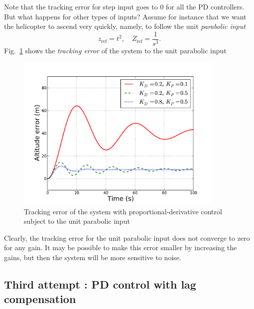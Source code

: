 \documentclass[a4paper,11pt]{report}
\theoremstyle{definition}
\newcommand{\re}{\mathrm{ref}}
\begin{document}
Note that the tracking error for step input goes to 0 for all the PD
controllers. But what happens for other types of inputs? Assume for
instance that we want the helicopter to ascend very quickly, namely,
to follow the unit \emph{parabolic input}
\[
z_\re = t^2, \quad Z_\re = \frac{1}{s^3}.
\]
Fig.~\ref{fig:paraberr} shows the \emph{tracking error}  of the system to the
unit parabolic input
\begin{figure}[H]
  \centering
  \includegraphics[width=10cm]{fig/paraberr.pdf}
  \caption{Tracking error of the system with proportional-derivative
    control subject to the unit parabolic input}
  \label{fig:paraberr}
\end{figure}

Clearly, the tracking error for the unit parabolic input does not
converge to zero for any gain. It may be possible to make this error
smaller by increasing the gains, but then the system will be more
sensitive to noise.

\subsection{Third attempt : PD control with lag compensation}
\end{document}
